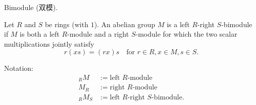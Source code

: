 \documentclass[11pt, a4paper]{report}
\begin{document}
\begin{definition}
Bimodule (双模).

Let $R$ and $S$ be rings (with $1$). An abelian group $M$ is a left $R$-right $S$-bimodule if $M$ is both a left $R$-module and a right $S$-module for which the two scalar multiplications jointly satisfy
\[
r(xs) = (rx)s \quad \text{for } r \in R, x \in M, s \in S.
\]

Notation:
\[
\begin{aligned}
{}_{R}M &:= \text{left } R\text{-module} \\
M_{R} &:= \text{right } R\text{-module} \\
{}_{R}M_{S} &:= \text{left } R\text{-right } S\text{-bimodule}.
\end{aligned}
\]

\end{definition}
\end{document}
